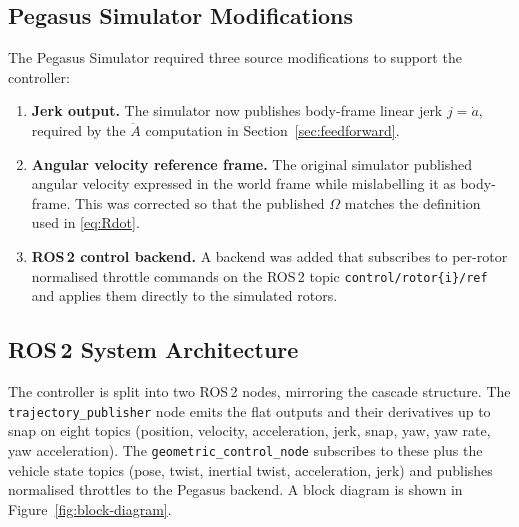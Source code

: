 \documentclass[11pt]{article}
\theoremstyle{remark}
\begin{document}
\subsection{Pegasus Simulator Modifications}
The Pegasus Simulator required three source modifications to support the controller:
\begin{enumerate}
    \item \textbf{Jerk output.} The simulator now publishes body-frame linear jerk $j = \dot a$, required by the $\ddot A$ computation in Section~\ref{sec:feedforward}.
    \item \textbf{Angular velocity reference frame.} The original simulator published angular velocity expressed in the world frame while mislabelling it as body-frame. This was corrected so that the published $\Omega$ matches the definition used in \eqref{eq:Rdot}.
    \item \textbf{ROS\,2 control backend.} A backend was added that subscribes to per-rotor normalised throttle commands on the ROS\,2 topic \texttt{control/rotor\{i\}/ref} and applies them directly to the simulated rotors.
\end{enumerate}

\subsection{ROS\,2 System Architecture}
The controller is split into two ROS\,2 nodes, mirroring the cascade structure. The \texttt{trajectory\_publisher} node emits the flat outputs and their derivatives up to snap on eight topics (position, velocity, acceleration, jerk, snap, yaw, yaw rate, yaw acceleration). The \texttt{geometric\_control\_node} subscribes to these plus the vehicle state topics (pose, twist, inertial twist, acceleration, jerk) and publishes normalised throttles to the Pegasus backend. A block diagram is shown in Figure~\ref{fig:block-diagram}.
\end{document}
